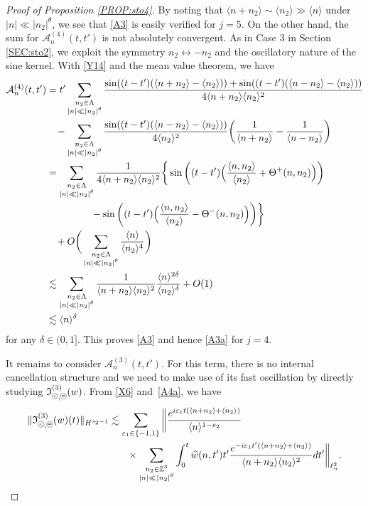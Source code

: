 \documentclass[%
11pt,  reqno]{amsart}
\newcommand{\pe}{\mathbin{\scaleobj{0.7}{\tikz \draw (0,0) node[shape=circle,draw,inner sep=0pt,minimum size=8.5pt] {\scriptsize  $=$};}}}
\newcommand{\pl}{\mathbin{\scaleobj{0.7}{\tikz \draw (0,0) node[shape=circle,draw,inner sep=0pt,minimum size=8.5pt] {\scriptsize $<$};}}}
\newcommand{\1}{\hspace{0.2mm}\text{I}\hspace{0.2mm}}
\newcommand{\Z}{\mathbb{Z}}
\newcommand{\dl}{\delta}
\newcommand{\eps}{\varepsilon}
\newcommand{\Ld}{\Lambda}
\newcommand{\ft}{\widehat}
\renewcommand{\l}{\ell}
\newcommand{\les}{\lesssim}
\newcommand{\jb}[1]
{\langle #1 \rangle}
\newcommand{\If}{\mathfrak{I}}
\newcommand{\A}{\mathcal{A}}
\numberwithin{equation}{section}
\numberwithin{theorem}{section}
\begin{document}
\begin{proof}[Proof of Proposition \ref{PROP:sto4}]
By noting that $\jb{n+n_2} \sim \jb{n_2}\gg \jb{n}$
under $ |n| \ll |n_2|^\theta$, 
we see that \eqref{A3} is easily verified for $j = 5$.
On the other hand, 
  the sum for $\A^{(4)}_{n} (t, t')$ 
is not absolutely convergent.
As in Case 3 in Section \ref{SEC:sto2}, 
we exploit the symmetry $n_2 \leftrightarrow -n_2$
and the oscillatory nature of the sine kernel.
With \eqref{Y14} and the mean value theorem, we have
\begin{align*}
 \A^{(4)}_{n} (t, t')
& = t'    \sum_{\substack{n_2 \in \Ld \\ |n| \ll |n_2|^\theta}}
 \frac{\sin ((t - t')( \jb{n + n_2 }- \jb{n_2}))
 + \sin ((t - t')( \jb{n - n_2 }- \jb{n_2}) )}{4\jb{ n + n_2} \jb{n_2}^2}  \notag \\
& \hphantom{X}
- \sum_{\substack{n_2 \in \Ld \\ |n| \ll |n_2|^\theta}}
 \frac{  \sin ((t - t')( \jb{n - n_2 }- \jb{n_2}) )}{4 \jb{n_2}^2}
 \bigg(\frac{1}{\jb{ n + n_2}} - \frac{1}{\jb{ n - n_2}}\bigg)
   \notag \\
& =    \sum_{\substack{n_2 \in \Ld \\ |n| \ll |n_2|^\theta}}
 \frac{1}{4\jb{ n + n_2} \jb{n_2}^2} 
 \bigg\{
\sin \bigg((t - t')\Big(  \frac{\jb{n, n_2}}{\jb{n_2}} + \Theta^+(n, n_2)\Big)\bigg)\notag \\
& \hphantom{XXXXX}
- \sin \bigg((t - t')\Big(  \frac{\jb{n, n_2}}{\jb{n_2}} - \Theta^-(n, n_2)\Big)\bigg)
 \bigg\} 
 \notag\\
& \hphantom{X}
 +   O\bigg(  \sum_{\substack{n_2 \in \Ld \\ |n| \ll |n_2|^\theta}}
 \frac{ \jb{n}}{\jb{n_2}^4}\bigg)\\
 & \les   \sum_{\substack{n_2 \in \Ld \\ |n| \ll |n_2|^\theta}}
 \frac{1}{\jb{ n + n_2} \jb{n_2}^2} 
\frac{\jb{n}^{2\dl}}{\jb{n_2}^\dl} + O(1)\\
& \les \jb{n}^\dl
\end{align*}
for any $\dl \in (0, 1]$.
This proves \eqref{A3} and hence \eqref{A3a}
for $j = 4$.

It remains to consider 
$ \A^{(3)}_{n} (t, t')$.
For this term, there is no internal cancellation structure
and we need to make use of its fast oscillation
by directly studying $\If_{\pl, \pe}^{(3)}(w)$.
From  \eqref{X6} and~\eqref{A4a},  we have
\begin{align}
\begin{split}
\|\If_{\pl, \pe}^{(3)}(w) (t)\|_{H^{s_2 - 1}}
&  \les 
\sum_{\eps_1 \in \{-1, 1\}}
\bigg\|
\frac{e^{i \eps_1 t ( \jb{n + n_2 }+ \jb{n_2})}}{\jb{n}^{1-s_2}} \\
& \hphantom{XX}
\times\sum_{\substack{n_2 \in \Z^3 \\ |n| \ll |n_2|^\theta}}
    \int_0^{t} 
\ft w(n, t')
t'    \frac{e^{ - i \eps_1   t'( \jb{n + n_2 }+ \jb{n_2})}}{ \jb{ n + n_2} \jb{n_2}^2} dt'\bigg\|_{\l^2_n}.
\end{split}
\label{A6}
\end{align}



\end{proof}
\end{document}
